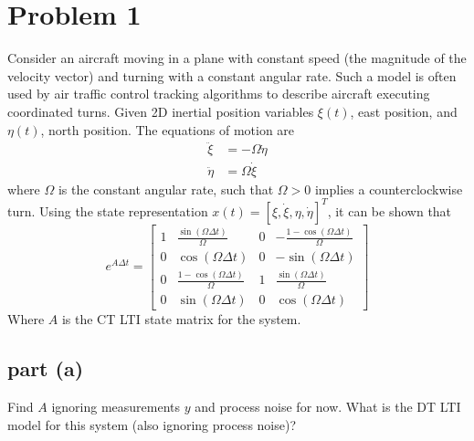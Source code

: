 \documentclass[11pt]{article}
\begin{document}
\thispagestyle{empty}

\newlength{\boxlength}\setlength{\boxlength}{\textwidth}
\addtolength{\boxlength}{-4mm}

\begin{center}
\end{center}

\section*{Problem 1}

Consider an aircraft moving in a plane with constant speed (the magnitude of the velocity vector) and turning with a constant angular rate. Such a model is often used by air traffic control tracking algorithms to describe aircraft executing coordinated turns. Given 2D inertial position variables $\xi(t)$, east position, and $\eta(t)$, north position. The equations of motion are 
\begin{align*}
	\ddot{\xi} &= -\Omega\dot{\eta} \\
	\ddot{\eta} &= \Omega\dot{\xi}
\end{align*}
where $\Omega$ is the constant angular rate, such that $\Omega > 0$ implies a counterclockwise turn. Using the state representation $x(t)=[\xi,\dot{\xi},\eta,\dot{\eta}]^T$, it can be shown that 
\begin{equation*}
	e^{A\Delta t} = \begin{bmatrix} 1 & \frac{\sin(\Omega\Delta t)}{\Omega} & 0 & -\frac{1-\cos(\Omega\Delta t)}{\Omega} \\ 0 & \cos(\Omega\Delta t) & 0 & -\sin(\Omega\Delta t) \\ 0 & \frac{1-\cos(\Omega\Delta t)}{\Omega} & 1 & \frac{\sin(\Omega\Delta t)}{\Omega} \\ 0 & \sin(\Omega\Delta t) & 0 & \cos(\Omega\Delta t) \end{bmatrix}
\end{equation*}
Where $A$ is the CT LTI state matrix for the system.

\subsection*{part (a)}
Find $A$ ignoring measurements $y$ and process noise for now. What is the DT LTI model for this system (also ignoring process noise)?
\end{document}
